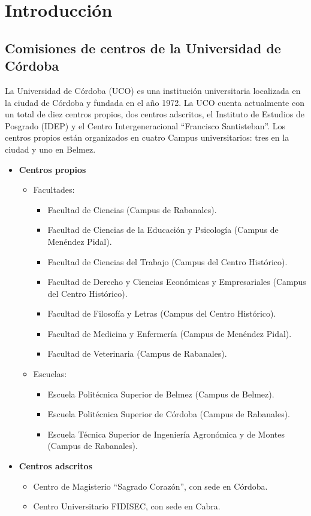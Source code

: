 \chapter{Introducción}

\section{Comisiones de centros de la Universidad de Córdoba}

La Universidad de Córdoba (UCO)\cite{uco} es una institución universitaria localizada en la ciudad de Córdoba y fundada en el año 1972. La UCO cuenta actualmente con un total de diez centros propios, dos centros adscritos, el Instituto de Estudios de Posgrado (IDEP) y el Centro Intergeneracional ``Francisco Santisteban''. Los centros propios están organizados en cuatro Campus universitarios: tres en la ciudad y uno en Belmez.
   \begin{itemize}
    \item \textbf{Centros propios}
        \begin{itemize}
        \item Facultades:
            \begin{itemize}
                \item Facultad de Ciencias (Campus de Rabanales).
                \item Facultad de Ciencias de la Educación y Psicología (Campus de Menéndez Pidal).
                \item Facultad de Ciencias del Trabajo  (Campus del Centro Histórico).
                \item Facultad de Derecho y Ciencias Económicas y Empresariales (Campus del Centro Histórico).
                \item Facultad de Filosofía y Letras (Campus del Centro Histórico).
                \item Facultad de Medicina y Enfermería  (Campus de Menéndez Pidal).
                \item Facultad de Veterinaria (Campus de Rabanales).
            \end{itemize}
        \item Escuelas:
        \begin{itemize}
            \item Escuela Politécnica Superior de Belmez (Campus de Belmez).
            \item Escuela Politécnica Superior de Córdoba (Campus de Rabanales).
            \item Escuela Técnica Superior de Ingeniería Agronómica y de Montes (Campus de Rabanales).
        \end{itemize}
    \end{itemize}
    \item \textbf{Centros adscritos}
    \begin{itemize}
        \item Centro de Magisterio ``Sagrado Corazón'', con sede en Córdoba.
        \item Centro Universitario FIDISEC, con sede en Cabra.
    \end{itemize}
\end{itemize}    

